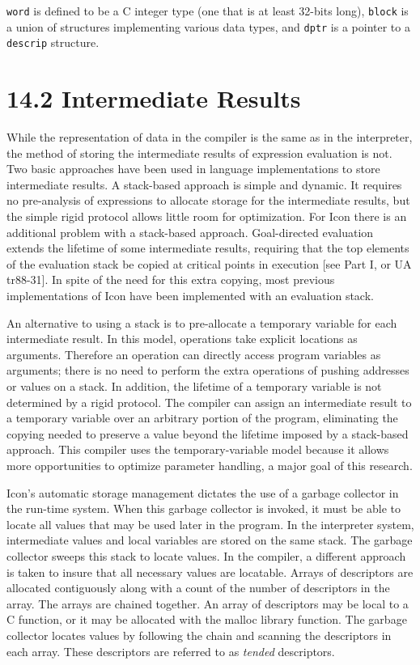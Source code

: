\noindent
\texttt{word} is defined to be a C integer type (one that is at least
32-bits long), \texttt{block} is a union of structures implementing
various data types, and \texttt{dptr} is a pointer to
a \texttt{descrip} structure.

\section[14.2 Intermediate Results]{14.2 Intermediate Results}

While the representation of data in the compiler is the same as in the
interpreter, the method of storing the intermediate results of
expression evaluation is not. Two basic approaches have been used in
language implementations to store intermediate results. A stack-based
approach is simple and dynamic. It requires no pre-analysis of
expressions to allocate storage for the intermediate results, but the
simple rigid protocol allows little room for optimization.  For Icon
there is an additional problem with a stack-based
approach. Goal-directed evaluation extends the lifetime of some
intermediate results, requiring that the top elements of the
evaluation stack be copied at critical points in execution [see Part
I, or UA tr88-31]. In spite of the need for this extra copying, most
previous implementations of Icon have been implemented with an
evaluation stack.

An alternative to using a stack is to pre-allocate a temporary
variable for each intermediate result. In this model, operations take
explicit locations as arguments. Therefore an operation can directly
access program variables as arguments; there is no need to perform the
extra operations of pushing addresses or values on a stack. In
addition, the lifetime of a temporary variable is not determined by a
rigid protocol. The compiler can assign an intermediate result to a
temporary variable over an arbitrary portion of the program,
eliminating the copying needed to preserve a value beyond the lifetime
imposed by a stack-based approach. This compiler uses the
temporary-variable model because it allows more opportunities to
optimize parameter handling, a major goal of this research.


Icon's automatic storage management dictates the use of a garbage
collector in the run-time system. When this garbage collector is
invoked, it must be able to locate all values that may be used later
in the program. In the interpreter system, intermediate values and
local variables are stored on the same stack. The garbage collector
sweeps this stack to locate values. In the compiler, a different
approach is taken to insure that all necessary values are locatable.
Arrays of descriptors are allocated contiguously along with a count of
the number of descriptors in the array. The arrays are chained
together. An array of descriptors may be local to a C function, or it
may be allocated with the malloc library function. The garbage
collector locates values by following the chain and scanning the
descriptors in each array. These descriptors are referred to as
\textit{tended} descriptors.

